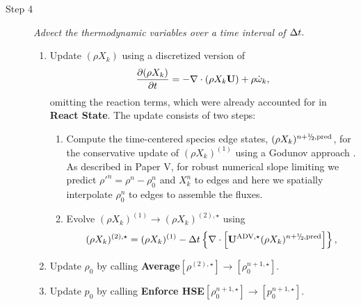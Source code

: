 \begin{description}
\item[Step 4] {\em Advect the thermodynamic variables over a time interval of $\Delta t.$}

\begin{enumerate}
\renewcommand{\theenumi}{{\bf \Alph{enumi}}}

\item Update $(\rho X_k)$ using a discretized version of
%
\begin{equation}
\frac{\partial(\rho X_k)}{\partial t} = -\nabla\cdot(\rho X_k\Ub) + \rho\omegadot_k,
\end{equation}
%
omitting the reaction terms, which were already
accounted for in {\bf React State}.  The update consists of two steps:

\begin{enumerate}
\renewcommand{\labelenumii}{{\bf \roman{enumii}}.}

\item Compute the time-centered species edge states, $(\rho X_k)^{\nph,\pred}$,
  for the conservative update of $(\rho X_k)^{(1)}$ using a Godunov approach \citep{XRB_III}.
  As described in Paper V, for robust numerical slope limiting we predict 
  $\rho'^n=\rho^n-\rho_0^n$ and $X_k^n$ to edges
  and here we spatially interpolate $\rho_0^n$ to edges to assemble the fluxes.

\item Evolve $(\rho X_k)^{(1)} \rightarrow (\rho X_k)^{(2),\star}$ using
\begin{equation}
(\rho X_k)^{(2),\star} = (\rho X_k)^{(1)}
  - \dt \left\{ \nabla \cdot \left[ \uadvone (\rho X_k)^{\nph,\pred} \right] \right\},
\end{equation}

\end{enumerate}

\item Update $\rho_0$ by calling {\bf Average}$[\rho^{(2),\star}]\rightarrow[\rho_0^{n+1,\star}]$.

\item Update $p_0$ by calling {\bf Enforce HSE}$[\rho_0^{n+1,\star}] \rightarrow [p_0^{n+1,\star}]$.


\end{enumerate}
\end{description}

